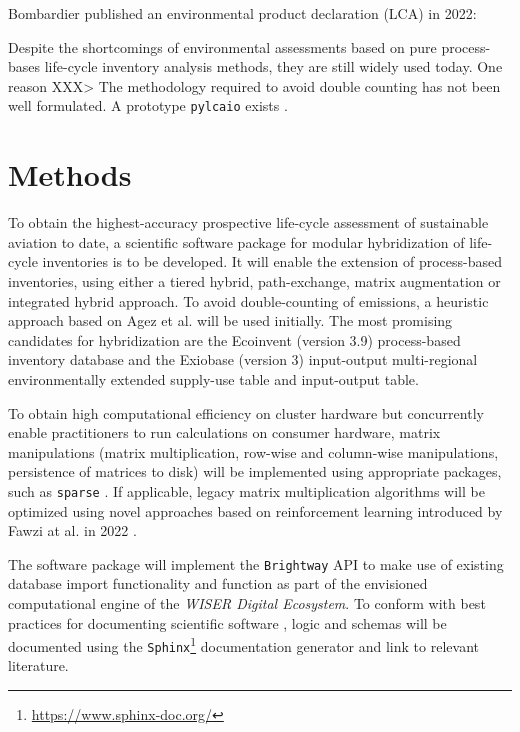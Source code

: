 \documentclass{article}
\begin{document}
    Bombardier published an environmental product declaration (LCA) in 2022: \cite{noauthor_challenger_2022}
    
    
        Despite the shortcomings of environmental assessments based on pure process-bases life-cycle inventory analysis methods, they are still widely used today. One reason XXX> The methodology required to avoid double counting has not been well formulated. A prototype \texttt{pylcaio}\cite{noauthor_pylcaio_2022} exists .
    
\section{Methods}

    To obtain the highest-accuracy prospective life-cycle assessment of sustainable aviation to date, a scientific software package for modular hybridization of life-cycle inventories is to be developed. It will enable the extension of process-based inventories, using either a tiered hybrid, path-exchange, matrix augmentation or integrated hybrid \cite{hauschild_life_2015}\cite{hauschild_life_2018}\cite{crawford_hybrid_2018} approach. To avoid double-counting of emissions, a heuristic approach based on Agez et al. \cite{agez_lifting_2019}\cite{agez_correcting_2022}\cite{agez_hybridization_2020} will be used initially. The most promising candidates for hybridization are the Ecoinvent (version 3.9) process-based inventory database and the Exiobase (version 3) input-output multi-regional environmentally extended supply-use  table and input-output table.
    
    To obtain high computational efficiency on cluster hardware but concurrently enable practitioners to run calculations on consumer hardware, matrix manipulations (matrix multiplication, row-wise and column-wise manipulations, persistence of matrices to disk) will be implemented using appropriate packages, such as \texttt{sparse} \cite{abbasi_sparse_2018}. If applicable, legacy matrix multiplication algorithms will be optimized using novel approaches based on reinforcement learning introduced by Fawzi at al. in 2022 \cite{fawzi_discovering_2022}.
    
    The software package will implement the \texttt{Brightway} API to make use of existing database import functionality and function as part of the envisioned computational engine of the \textit{WISER Digital Ecosystem}. To conform with best practices for documenting scientific software \cite{lee_ten_2018}, logic and schemas will be documented using the \texttt{Sphinx}\footnote{\url{https://www.sphinx-doc.org/}} documentation generator and link to relevant literature.
    
\end{document}
